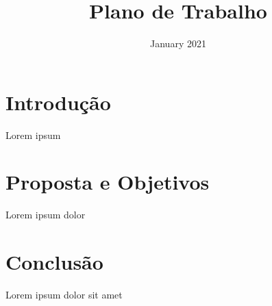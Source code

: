 \documentclass[a4paper]
{article}
\title{Plano de Trabalho}
\date{January 2021}
\begin{document}

\newpage

\tableofcontents
\newpage
\section{Introdução}

Lorem ipsum

\newpage
\section{Proposta e Objetivos}

Lorem ipsum dolor 
\newpage
\section{Conclusão}

Lorem ipsum dolor sit amet

\newpage


\end{document}
